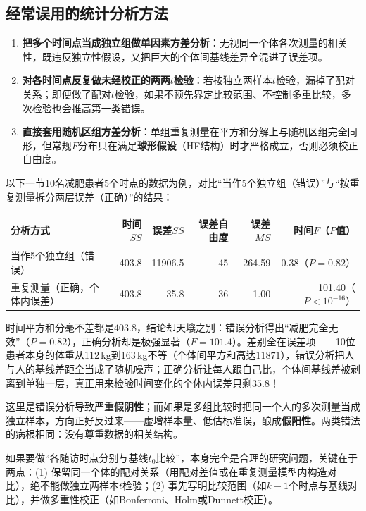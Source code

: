 \subsection{经常误用的统计分析方法}
\begin{enumerate}
\item \textbf{把多个时间点当成独立组做单因素方差分析}：无视同一个体各次测量的相关性，既违反独立性假设，又把巨大的个体间基线差异全混进了误差项。
\item \textbf{对各时间点反复做未经校正的两两$t$检验}：若按独立两样本$t$检验，漏掉了配对关系；即便做了配对$t$检验，如果不预先界定比较范围、不控制多重比较，多次检验也会推高第一类错误。
\item \textbf{直接套用随机区组方差分析}：单组重复测量在平方和分解上与随机区组完全同形，但常规$F$分布只在满足\textbf{球形假设}（HF结构）时才严格成立，否则必须校正自由度。
\end{enumerate}

\begin{sikao}
以下一节10名减肥患者5个时点的数据为例，对比“当作5个独立组（错误）”与“按重复测量拆分两层误差（正确）”的结果：
\begin{center}\small
\begin{tabular}{lrrrrr}
\toprule 分析方式&时间$SS$&误差$SS$&误差自由度&误差$MS$&时间$F$（$P$值）\\\midrule
当作5个独立组（错误）&403.8&11906.5&45&264.59&0.38（$P=0.82$）\\
重复测量（正确，个体内误差）&403.8&35.8&36&1.00&101.40（$P<10^{-16}$）\\\bottomrule
\end{tabular}
\end{center}
时间平方和分毫不差都是$403.8$，结论却天壤之别：错误分析得出“减肥完全无效”（$P=0.82$），正确分析却是极强显著（$F=101.4$）。差别全在误差项——10位患者本身的体重从112\,kg到163\,kg不等（个体间平方和高达$11871$），错误分析把人与人的基线差距全当成了随机噪声；正确分析让每人跟自己比，个体间基线差被剥离到单独一层，真正用来检验时间变化的个体内误差只剩$35.8$！

这里是错误分析导致严重\textbf{假阴性}；而如果是多组比较时把同一个人的多次测量当成独立样本，方向正好反过来——虚增样本量、低估标准误，酿成\textbf{假阳性}。两类错法的病根相同：没有尊重数据的相关结构。
\end{sikao}

如果要做“各随访时点分别与基线$t_0$比较”，本身完全是合理的研究问题，关键在于两点：(1) 保留同一个体的配对关系（用配对差值或在重复测量模型内构造对比），绝不能做独立两样本$t$检验；(2) 事先写明比较范围（如$k-1$个时点与基线对比），并做多重性校正（如Bonferroni、Holm或Dunnett校正）。

